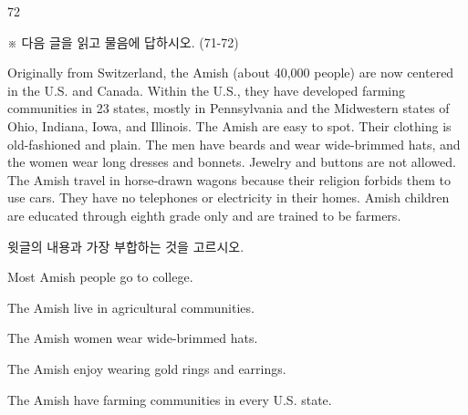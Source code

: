 \begin{question}{72}
\begin{framedtext}
※ 다음 글을 읽고 물음에 답하시오. (71-72) \par
Originally from Switzerland, the Amish (about 40,000 people) are now centered in the U.S. and Canada. Within the U.S., they have developed farming communities in 23 states, mostly in Pennsylvania and the Midwestern states of Ohio, Indiana, Iowa, and Illinois. The Amish are easy to spot. Their clothing is old-fashioned and plain. The men have beards and wear wide-brimmed hats, and the women wear long dresses and bonnets. Jewelry and buttons are not allowed. The Amish travel in horse-drawn wagons because their religion forbids them to use cars. They have no telephones or electricity in their homes. Amish children are educated through eighth grade only and are trained to be farmers. \par
\end{framedtext}
윗글의 내용과 가장 부합하는 것을 고르시오.
\begin{choices}
  \item Most Amish people go to college.
  \item The Amish live in agricultural communities.
  \item The Amish women wear wide-brimmed hats.
  \item The Amish enjoy wearing gold rings and earrings.
  \item The Amish have farming communities in every U.S. state.
\end{choices}
\end{question}
